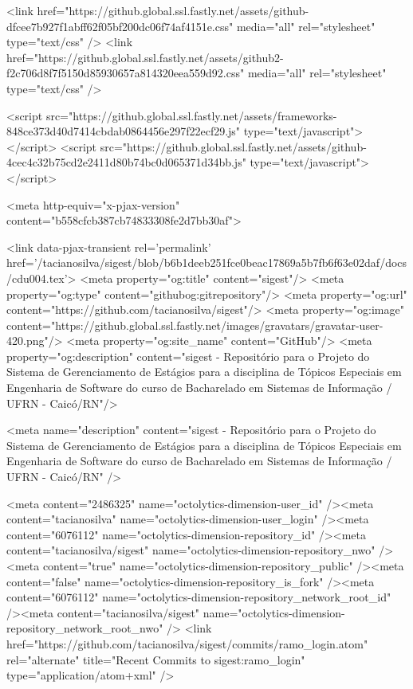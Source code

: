     <link href="https://github.global.ssl.fastly.net/assets/github-dfcee7b927f1abff62f05bf200dc06f74af4151e.css" media="all" rel="stylesheet" type="text/css" />
    <link href="https://github.global.ssl.fastly.net/assets/github2-f2c706d8f7f5150d85930657a814320eea559d92.css" media="all" rel="stylesheet" type="text/css" />
    

    

      <script src="https://github.global.ssl.fastly.net/assets/frameworks-848ce373d40d7414cbdab0864456e297f22ecf29.js" type="text/javascript"></script>
      <script src="https://github.global.ssl.fastly.net/assets/github-4cec4c32b75cd2e2411d80b74bc0d065371d34bb.js" type="text/javascript"></script>
      
      <meta http-equiv="x-pjax-version" content="b558cfcb387cb74833308fe2d7bb30af">

        <link data-pjax-transient rel='permalink' href='/tacianosilva/sigest/blob/b6b1deeb251fce0beac17869a5b7fb6f63e02daf/docs/cdu004.tex'>
  <meta property="og:title" content="sigest"/>
  <meta property="og:type" content="githubog:gitrepository"/>
  <meta property="og:url" content="https://github.com/tacianosilva/sigest"/>
  <meta property="og:image" content="https://github.global.ssl.fastly.net/images/gravatars/gravatar-user-420.png"/>
  <meta property="og:site_name" content="GitHub"/>
  <meta property="og:description" content="sigest - Repositório para o Projeto do Sistema de Gerenciamento de Estágios para a disciplina de Tópicos Especiais em Engenharia de Software do curso de Bacharelado em Sistemas de Informação / UFRN - Caicó/RN"/>

  <meta name="description" content="sigest - Repositório para o Projeto do Sistema de Gerenciamento de Estágios para a disciplina de Tópicos Especiais em Engenharia de Software do curso de Bacharelado em Sistemas de Informação / UFRN - Caicó/RN" />

  <meta content="2486325" name="octolytics-dimension-user_id" /><meta content="tacianosilva" name="octolytics-dimension-user_login" /><meta content="6076112" name="octolytics-dimension-repository_id" /><meta content="tacianosilva/sigest" name="octolytics-dimension-repository_nwo" /><meta content="true" name="octolytics-dimension-repository_public" /><meta content="false" name="octolytics-dimension-repository_is_fork" /><meta content="6076112" name="octolytics-dimension-repository_network_root_id" /><meta content="tacianosilva/sigest" name="octolytics-dimension-repository_network_root_nwo" />
  <link href="https://github.com/tacianosilva/sigest/commits/ramo_login.atom" rel="alternate" title="Recent Commits to sigest:ramo_login" type="application/atom+xml" />

